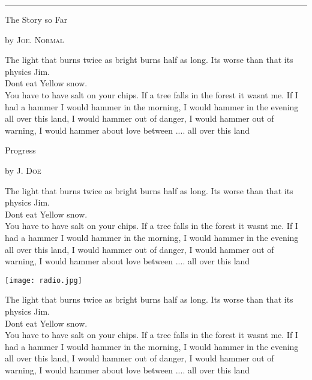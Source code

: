 \documentclass[10pt,a4paper]{article}
\newcommand{\SepRule}{\noindent							 %
						\begin{center}
							\rule{250pt}{1pt}
						\end{center}
						}
\newcommand{\NewsItem}[1]{%
		\usefont{T1}{augie}{m}{n} 	
		\large #1 \vspace{4pt}
		\par \normalsize \normalfont}
\newcommand{\NewsAuthor}[1]{%
			\hfill by \textsc{#1} \vspace{4pt}
			\par \normalfont}
\begin{document}
\vspace{0.5cm}
	\SepRule
\vspace{0.5cm}
\begin{multicols}{3}
	\NewsItem{The Story so Far}
	\NewsAuthor{Joe. Normal}
	The light that burns twice as bright burns half as long. Its worse than that its physics Jim. \\
    Dont eat Yellow snow.\\ You have to have salt on your chips. If a tree falls in the forest it wasnt me. If I had a hammer I would hammer in the morning, I would hammer in the evening all over this land, I would hammer out of danger, I would hammer out of warning, I would hammer about love between .... all over this land

\vspace{1cm}
\NewsItem{Progress}
\NewsAuthor{J. Doe}
The light that burns twice as bright burns half as long. Its worse than that its physics Jim. \\
    Dont eat Yellow snow.\\ You have to have salt on your chips. If a tree falls in the forest it wasnt me. If I had a hammer I would hammer in the morning, I would hammer in the evening all over this land, I would hammer out of danger, I would hammer out of warning, I would hammer about love between .... all over this land
		\begin{center}
			\texttt{[image: radio.jpg]}
		\end{center}
		The light that burns twice as bright burns half as long. Its worse than that its physics Jim. \\
    Dont eat Yellow snow.\\ You have to have salt on your chips. If a tree falls in the forest it wasnt me. If I had a hammer I would hammer in the morning, I would hammer in the evening all over this land, I would hammer out of danger, I would hammer out of warning, I would hammer about love between .... all over this land
\end{multicols}
\end{document}
